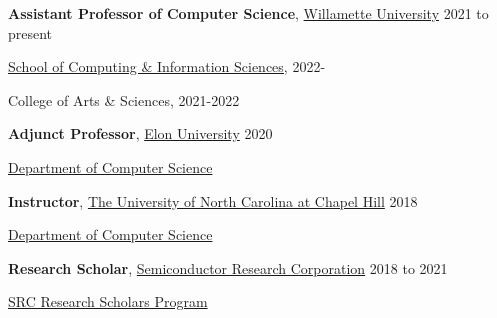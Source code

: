 \documentclass[10pt]{article}
\newcommand{\halfblankline}{\quad\vspace{-0.5\baselineskip}\pagebreak[3]}
\begin{document}
\textbf{Assistant Professor of Computer Science},
            \href{https://willamette.edu/}{Willamette University}
            \hfill {2021 to present}
\begin{innerlist}

\item[]\href{https://willamette.edu/computing/}{School of Computing \& Information Sciences}, 2022-
\item[]College of Arts \& Sciences, 2021-2022
\end{innerlist}

\halfblankline


\textbf{Adjunct Professor},
            \href{https://www.elon.edu/}{Elon University}
            \hfill {2020}
\begin{innerlist}
\item[]\href{https://www.elon.edu/u/academics/arts-and-sciences/computer-science/}{Department of Computer Science}

\end{innerlist}

\halfblankline

\textbf{Instructor},
            \href{https://www.unc.edu/}{The University of North Carolina at Chapel Hill}
            \hfill {2018}
\begin{innerlist}
\item[]\href{https://cs.unc.edu/}{Department of Computer Science}
\end{innerlist}

\halfblankline

\textbf{Research Scholar},
            \href{https://www.src.org/}{Semiconductor Research Corporation}
            \hfill {2018 to 2021}
\begin{innerlist}
    \item[] \href{https://www.src.org/student-center/}{SRC Research Scholars Program}
\end{innerlist}

\halfblankline
\end{document}
